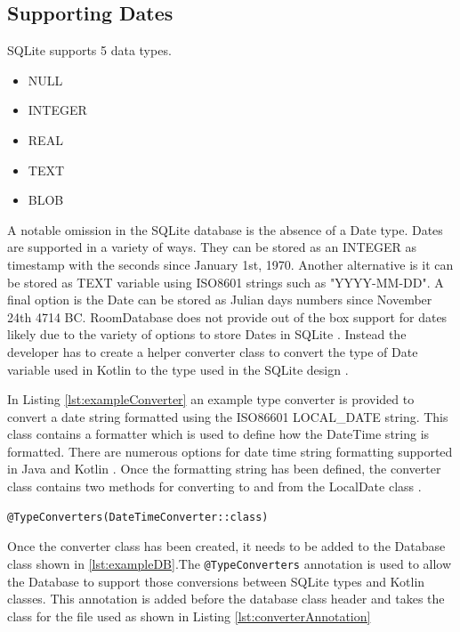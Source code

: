 \documentclass[12pt]{article}
\begin{document}
\subsection{Supporting Dates}


SQLite supports 5 data types. 
\begin{itemize}
\item NULL 
\item INTEGER
\item REAL
\item TEXT
\item BLOB
\end{itemize}
A notable omission in the SQLite database is the absence of a Date type. Dates are supported in a variety of ways. They can be stored as an INTEGER as timestamp with the seconds since January 1st, 1970. Another alternative is it can be stored as TEXT variable using ISO8601 strings such as "YYYY-MM-DD". A final option is the Date can be stored as Julian days numbers since November 24th 4714 BC. RoomDatabase does not provide out of the box support for dates likely due to the variety of options to store Dates in SQLite \cite{SqliteDataTypes}. Instead the developer has to create a helper converter class to convert the type of Date variable used in Kotlin to the type used in the SQLite design \cite{RoomDBTypeConverters} \cite{LuaSoftwareLocalDateTime}. 

In Listing \ref{lst:exampleConverter} an example type converter is provided to convert a date string formatted using the ISO86601 LOCAL\_DATE string. This class contains a formatter which is used to define how the DateTime string is formatted. There are numerous options for date time string formatting supported in Java and Kotlin \cite{DateTimeFormatterDocs} \cite{AndroidDateTimeFormatterDocs}. Once the formatting string has been defined, the converter class contains two methods for converting to and from the LocalDate class \cite{StackOverflowLocalDate}. 

\begin{lstlisting}[numbers=none, 
			caption=Task to generate Dokka documentation,
			label={lst:converterAnnotation}]
@TypeConverters(DateTimeConverter::class)
\end{lstlisting}

Once the converter class has been created, it needs to be added to the Database class shown in \ref{lst:exampleDB}.The \verb|@TypeConverters| annotation is used to allow the Database to support those conversions between SQLite types and Kotlin classes. This annotation is added before the database class header and takes the class for the file used as shown in Listing \ref{lst:converterAnnotation} 
\end{document}
